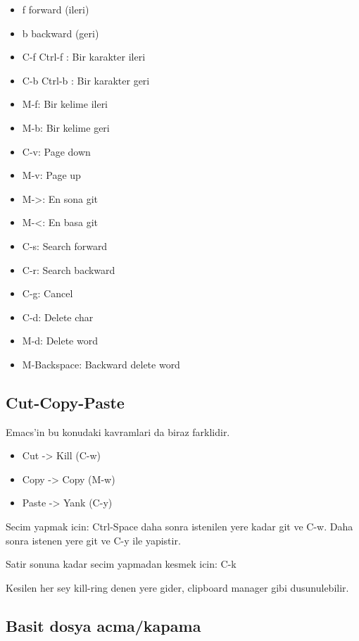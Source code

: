 \documentclass[11pt]{article}
\begin{document}
\begin{itemize}
\item f forward (ileri)
\item b backward (geri)

\item C-f Ctrl-f : Bir karakter ileri
\item C-b Ctrl-b : Bir karakter geri
\item M-f: Bir kelime ileri
\item M-b: Bir kelime geri

\item C-v: Page down
\item M-v: Page up

\item M->: En sona git
\item M-<: En basa git

\item C-s: Search forward
\item C-r: Search backward

\item C-g: Cancel

\item C-d: Delete char
\item M-d: Delete word
\item M-Backspace: Backward delete word
\end{itemize}

\subsection{Cut-Copy-Paste}
\label{sec-2-4}

Emacs'in bu konudaki kavramlari da biraz farklidir.

\begin{itemize}
\item Cut   -> Kill (C-w)
\item Copy  -> Copy (M-w)
\item Paste -> Yank (C-y)
\end{itemize}

Secim yapmak icin: Ctrl-Space daha sonra istenilen yere kadar git ve
C-w. Daha sonra istenen yere git ve C-y ile yapistir.

Satir sonuna kadar secim yapmadan kesmek icin: C-k

Kesilen her sey kill-ring denen yere gider, clipboard manager gibi dusunulebilir.


\subsection{Basit dosya acma/kapama}
\label{sec-2-5}
\end{document}
